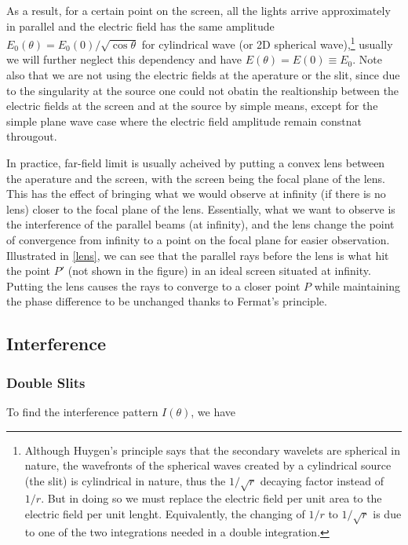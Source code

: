 \documentclass[english,a4paper,12pt]{report}
\begin{document}
As a result, for a certain point on the screen, all the lights arrive approximately in parallel and the electric field has the same amplitude \(E_0 (\theta ) = E_0 (0) / \sqrt{\cos \theta } \) for cylindrical wave (or 2D spherical wave),\footnote{Although Huygen's principle says that the secondary wavelets are spherical in nature, the wavefronts of the spherical waves created by a cylindrical source (the slit) is cylindrical in nature, thus the \(1 /\sqrt{r} \) decaying factor instead of \(1/r\). But in doing so we must replace the electric field per unit area to the electric field per unit lenght. Equivalently, the changing of \(1/r\) to \(1/\sqrt{r} \) is due to one of the two integrations needed in a double integration.} usually we will further neglect this dependency and have \(E(\theta ) = E(0) \equiv  E_0 \). Note also that we are not using the electric fields at the aperature or the slit, since due to the singularity at the source one could not obatin the realtionship between the electric fields at the screen and at the source by simple means, except for the simple plane wave case where the electric field amplitude remain constnat througout.

In practice, far-field limit is usually acheived by putting a convex lens between the aperature and the screen, with the screen being the focal plane of the lens. This has the effect of bringing what we would observe at infinity (if there is no lens) closer to the focal plane of the lens. Essentially, what we want to observe is the interference of the parallel beams (at infinity), and the lens change the point of convergence from infinity to a point on the focal plane for easier observation. Illustrated in \cref{lens}, we can see that the parallel rays before the lens is what hit the point \(P'\) (not shown in the figure) in an ideal screen situated at infinity. Putting the lens causes the rays to converge to a closer point \(P\) while maintaining the phase difference to be unchanged thanks to Fermat's principle.


\subsection{Interference}

\subsubsection{Double Slits}

To find the interference pattern \(I(\theta )\), we have
\end{document}
